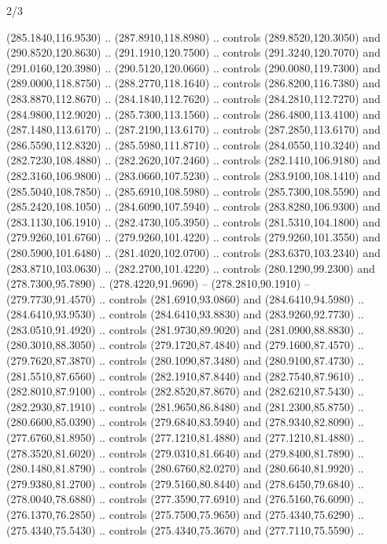\begin{flagdescription}{2/3}
\begin{scope}[xshift=0.5\flaglength,yshift=0.5\flagwidth,scale=\stretchfactor]
\begin{scope}[scale=0.001645\flagwidth,yshift=65mm,xshift=-63mm]
\begin{scope}[y=0.80pt, x=0.80pt, yscale=-1,]
\begin{scope}[cm={{1.33333,0.0,0.0,1.33333,(0.0,1e-05)}}]
  (285.1840,116.9530) .. (287.8910,118.8980) .. controls (289.8520,120.3050) and
  (290.8520,120.8630) .. (291.1910,120.7500) .. controls (291.3240,120.7070) and
  (291.0160,120.3980) .. (290.5120,120.0660) .. controls (290.0080,119.7300) and
  (289.0000,118.8750) .. (288.2770,118.1640) .. controls (286.8200,116.7380) and
  (283.8870,112.8670) .. (284.1840,112.7620) .. controls (284.2810,112.7270) and
  (284.9800,112.9020) .. (285.7300,113.1560) .. controls (286.4800,113.4100) and
  (287.1480,113.6170) .. (287.2190,113.6170) .. controls (287.2850,113.6170) and
  (286.5590,112.8320) .. (285.5980,111.8710) .. controls (284.0550,110.3240) and
  (282.7230,108.4880) .. (282.2620,107.2460) .. controls (282.1410,106.9180) and
  (282.3160,106.9800) .. (283.0660,107.5230) .. controls (283.9100,108.1410) and
  (285.5040,108.7850) .. (285.6910,108.5980) .. controls (285.7300,108.5590) and
  (285.2420,108.1050) .. (284.6090,107.5940) .. controls (283.8280,106.9300) and
  (283.1130,106.1910) .. (282.4730,105.3950) .. controls (281.5310,104.1800) and
  (279.9260,101.6760) .. (279.9260,101.4220) .. controls (279.9260,101.3550) and
  (280.5900,101.6480) .. (281.4020,102.0700) .. controls (283.6370,103.2340) and
  (283.8710,103.0630) .. (282.2700,101.4220) .. controls (280.1290,99.2300) and
  (278.7300,95.7890) .. (278.4220,91.9690) -- (278.2810,90.1910) --
  (279.7730,91.4570) .. controls (281.6910,93.0860) and (284.6410,94.5980) ..
  (284.6410,93.9530) .. controls (284.6410,93.8830) and (283.9260,92.7730) ..
  (283.0510,91.4920) .. controls (281.9730,89.9020) and (281.0900,88.8830) ..
  (280.3010,88.3050) .. controls (279.1720,87.4840) and (279.1600,87.4570) ..
  (279.7620,87.3870) .. controls (280.1090,87.3480) and (280.9100,87.4730) ..
  (281.5510,87.6560) .. controls (282.1910,87.8440) and (282.7540,87.9610) ..
  (282.8010,87.9100) .. controls (282.8520,87.8670) and (282.6210,87.5430) ..
  (282.2930,87.1910) .. controls (281.9650,86.8480) and (281.2300,85.8750) ..
  (280.6600,85.0390) .. controls (279.6840,83.5940) and (278.9340,82.8090) ..
  (277.6760,81.8950) .. controls (277.1210,81.4880) and (277.1210,81.4880) ..
  (278.3520,81.6020) .. controls (279.0310,81.6640) and (279.8400,81.7890) ..
  (280.1480,81.8790) .. controls (280.6760,82.0270) and (280.6640,81.9920) ..
  (279.9380,81.2700) .. controls (279.5160,80.8440) and (278.6450,79.6840) ..
  (278.0040,78.6880) .. controls (277.3590,77.6910) and (276.5160,76.6090) ..
  (276.1370,76.2850) .. controls (275.7500,75.9650) and (275.4340,75.6290) ..
  (275.4340,75.5430) .. controls (275.4340,75.3670) and (277.7110,75.5590) ..

\end{scope}
\end{scope}
\end{scope}
\end{scope}
\end{flagdescription}

